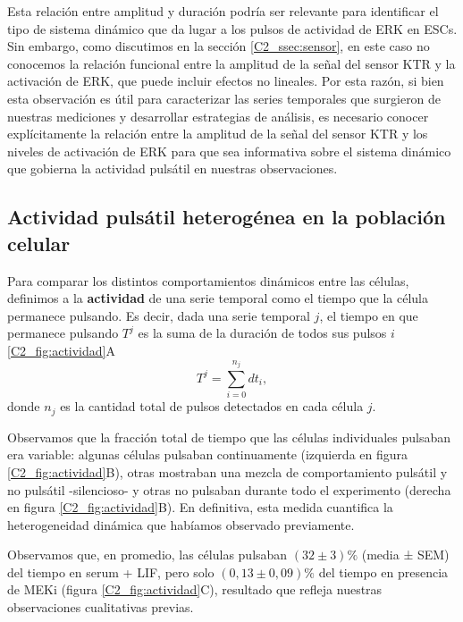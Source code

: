 \documentclass[./main.tex]{subfiles}
\begin{document}
Esta relación entre amplitud y duración podría ser relevante para identificar el tipo de sistema dinámico que da lugar a los pulsos de actividad de ERK en ESCs. Sin embargo, como discutimos en la sección \ref{C2_ssec:sensor}, en este caso no conocemos la relación funcional entre la amplitud de la señal del sensor KTR y la activación de ERK, que puede incluir efectos no lineales. Por esta razón, si bien esta observación es útil para caracterizar las series temporales que surgieron de nuestras mediciones y desarrollar estrategias de análisis, es necesario conocer explícitamente la relación entre la amplitud de la señal del sensor KTR y los niveles de activación de ERK para que sea informativa sobre el sistema dinámico que gobierna la actividad pulsátil en nuestras observaciones. 


\subsection{Actividad pulsátil heterogénea en la población celular}

Para comparar los distintos comportamientos dinámicos entre las células, definimos a la \textbf{actividad} de una serie temporal como el tiempo que la célula permanece pulsando. Es decir, dada una serie temporal $j$, el tiempo en que permanece pulsando $T^j$ es la suma de la duración de todos sus pulsos $i$ \ref{C2_fig:actividad}A 
\begin{equation}
    T^j = \sum_{i=0}^{n_j} dt_i,
    \label{C2_eq:actividad}
\end{equation}
donde $n_j$ es la cantidad total de pulsos detectados en cada célula $j$.

Observamos que la fracción total de tiempo que las células individuales pulsaban era variable: algunas células pulsaban continuamente (izquierda en figura \ref{C2_fig:actividad}B), otras mostraban una mezcla de comportamiento pulsátil y no pulsátil -silencioso- y otras no pulsaban durante todo el experimento (derecha en figura \ref{C2_fig:actividad}B). En definitiva, esta medida cuantifica la heterogeneidad dinámica que habíamos observado previamente. 
 

Observamos que, en promedio, las células pulsaban $(32 \pm 3)\%$ (media ± SEM) del tiempo en serum + LIF, pero solo $(0,13 \pm 0,09) \%$ del tiempo en presencia de MEKi (figura \ref{C2_fig:actividad}C), resultado que refleja nuestras observaciones cualitativas previas. 
\end{document}
